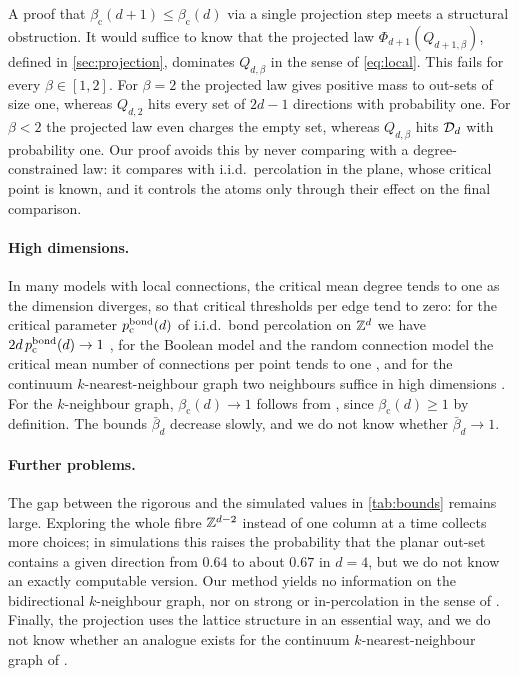 \documentclass[11pt,letterpaper]{article}
\begin{document}
A proof that $\beta_{\mathrm c}(d+1)\le\beta_{\mathrm c}(d)$ via a single projection step meets a structural obstruction. It would suffice to know that the projected law $\Phi_{d+1}(Q_{d+1,\beta})$, defined in \cref{sec:projection}, dominates $Q_{d,\beta}$ in the sense of \cref{eq:local}. This fails for every $\beta\in[1,2]$. For $\beta=2$ the projected law gives positive mass to out-sets of size one, whereas $Q_{d,2}$ hits every set of $2d-1$ directions with probability one. For $\beta<2$ the projected law even charges the empty set, whereas $Q_{d,\beta}$ hits $\mathcal D_d$ with probability one. Our proof avoids this by never comparing with a degree-constrained law: it compares with i.i.d.\ percolation in the plane, whose critical point is known, and it controls the atoms only through their effect on the final comparison.

\paragraph{High dimensions.}
In many models with local connections, the critical mean degree tends to one as the dimension diverges, so that critical thresholds per edge tend to zero: for the critical parameter $p^{\mathrm{bond}}_{\mathrm c}(d)$ of i.i.d.\ bond percolation on $\mathbb Z^d$ we have $2d\,p^{\mathrm{bond}}_{\mathrm c}(d)\to1$ \cite{Kes90}, for the Boolean model and the random connection model the critical mean number of connections per point tends to one \cite{Pen96,MPS97}, and for the continuum $k$-nearest-neighbour graph two neighbours suffice in high dimensions \cite{HM96}. For the $k$-neighbour graph, $\beta_{\mathrm c}(d)\to1$ follows from \cite[Corollary~3.7]{BJKLRT25}, since $\beta_{\mathrm c}(d)\ge1$ by definition. The bounds $\bar\beta_d$ decrease slowly, and we do not know whether $\bar\beta_d\to1$.

\paragraph{Further problems.}
The gap between the rigorous and the simulated values in \cref{tab:bounds} remains large. Exploring the whole fibre $\mathbb Z^{d-2}$ instead of one column at a time collects more choices; in simulations this raises the probability that the planar out-set contains a given direction from $0.64$ to about $0.67$ in $d=4$, but we do not know an exactly computable version. Our method yields no information on the bidirectional $k$-neighbour graph, nor on strong or in-percolation in the sense of \cite{BB13}. Finally, the projection uses the lattice structure in an essential way, and we do not know whether an analogue exists for the continuum $k$-nearest-neighbour graph of \cite{HM96}.
\end{document}
